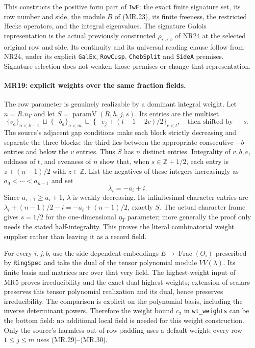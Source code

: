 This constructs the positive form part of \texttt{TwF}: the exact
finite signature set, its row number and side, the module $B$ of
(MR.23), its finite freeness, the restricted Hecke operators, and
the integral eigenvalues. The signature Galois representation is
the actual previously constructed $\rho_{i,\sigma,b}$ of NR24
at the selected original row and side. Its continuity and its
universal reading clause follow from NR24, under its explicit
\texttt{GalEx}, \texttt{RowCusp}, \texttt{ChebSplit} and
\texttt{SideA} premises. Signature selection does not weaken
those premises or change that representation.

\paragraph{MR19: explicit weights over the same fraction fields.}
The row parameter is genuinely realizable by a dominant integral
weight. Let $n=R.n_V$ and let $S=\operatorname{paramV}(R,h,j,s)$.
Its entries are the multiset
\[
 \{v_a\}_{a<k-1}\ \sqcup\ \{-b_a\}_{a<m}\ \sqcup\
 \{-e_j+(t-1-2c)/2\}_{c<t},
          \quad\text{then shifted by }-s.           \tag{MR.29}
\]
The source's adjacent gap conditions make each block strictly
decreasing and separate the three blocks: the third lies between
the appropriate consecutive $-b$ entries and below the $v$ entries.
Thus $S$ has $n$ distinct entries. Integrality of $v,b,e$, oddness
of $t$, and evenness of $n$ show that, when $s\in\mathbb Z+1/2$,
each entry is $z+(n-1)/2$ with $z\in\mathbb Z$.
List the negatives of these integers increasingly as
$a_0<\cdots<a_{n-1}$ and set
\[
                         \lambda_i=-a_i+i.          \tag{MR.30}
\]
Since $a_{i+1}\ge a_i+1$, $\lambda$ is weakly decreasing.
Its infinitesimal-character entries are
$\lambda_i+(n-1)/2-i=-a_i+(n-1)/2$, exactly $S$.
The actual character frame gives $s=1/2$ for the one-dimensional
$\eta_T$ parameter; more generally the proof only needs the stated
half-integrality. This proves the literal combinatorial weight
supplier rather than leaving it as a record field.

For every $i,j,b$, use the side-dependent embeddings
$E\to\operatorname{Frac}(O_i)$ prescribed by \texttt{RingSpec}
and take the dual of the tensor polynomial module $VV(\lambda)$.
Its finite basis and matrices are over that very field. The
highest-weight input of MR5 proves irreducibility and the exact
dual highest weights; extension of scalars preserves this tensor
polynomial realization and its dual, hence preserves
irreducibility. The comparison is explicit on the polynomial
basis, including the inverse determinant powers. Therefore the
weight bound $c_2$ in \texttt{wt\_weights} can be the bottom field:
no additional local field is needed for this weight construction.
Only the source's harmless out-of-row padding uses a default
weight; every row $1\le j\le m$ uses (MR.29)--(MR.30).

